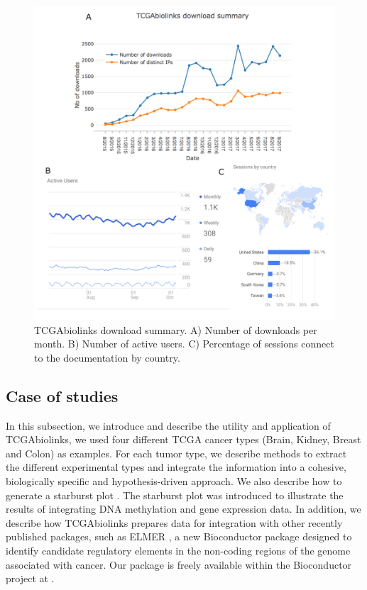 \begin{figure}[h!]
	\centering
	\includegraphics[width=1.0\linewidth]{images/tcgabiolinks_download.pdf}
	\caption[TCGAbiolinks download summary]{TCGAbiolinks download summary. A) Number of downloads per month. B) Number of active users. C) Percentage of sessions connect to the documentation by country.}
	\label{fig:tcgabiolinksdownload}
\end{figure}

\subsection{Case of studies}

In this subsection, we introduce and describe the utility and application of TCGAbiolinks, we used four different TCGA cancer types
(Brain, Kidney, Breast and Colon) as examples. For each
tumor type, we describe methods to extract the different experimental
types and integrate the information into a cohesive,
biologically specific and hypothesis-driven approach.
We also describe how to generate a starburst plot \cite{noushmehr2010identification}. The
starburst plot was introduced to illustrate the results of integrating
DNA methylation and gene expression data. In
addition, we describe how TCGAbiolinks prepares data for
integration with other recently published packages, such as
ELMER \cite{yao2015inferring}, a new Bioconductor package designed to
identify candidate regulatory elements in the non-coding
regions of the genome associated with cancer. Our package
is freely available within the Bioconductor project at
.




